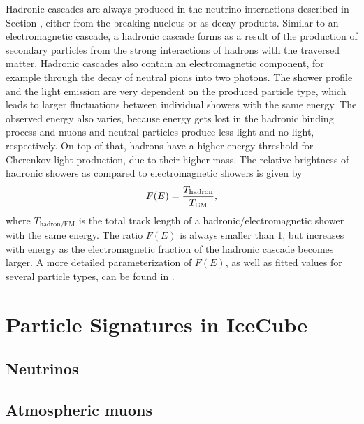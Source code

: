 Hadronic cascades are always produced in the neutrino interactions described in Section , either from the breaking nucleus or as decay products.
Similar to an electromagnetic cascade, a hadronic cascade forms as a result of the production of secondary particles from the strong interactions of hadrons with the traversed matter.
Hadronic cascades also contain an electromagnetic component, for example through the decay of neutral pions into two photons. 
The shower profile and the light emission are very dependent on the produced particle type, which leads to larger fluctuations between individual showers with the same energy.
The observed energy also varies, because energy gets lost in the hadronic binding process and muons and neutral particles produce less light and no light, respectively.
On top of that, hadrons have a higher energy threshold for Cherenkov light production, due to their higher mass.
The relative brightness of hadronic showers as compared to electromagnetic showers is given by 
\begin{equation}
    F(E) = \frac{T_\mathrm{hadron}}{T_\mathrm{EM}},%
    \labeq{relative_shower_brighness}
\end{equation}
where $T_\mathrm{hadron/EM}$ is the total track length of a hadronic/electromagnetic shower with the same energy.
The ratio $F(E)$ is always smaller than 1, but increases with energy as the electromagnetic fraction of the hadronic cascade becomes larger.
A more detailed parameterization of $F(E)$, as well as fitted values for several particle types, can be found in .


\section{Particle Signatures in IceCube}

\subsection{Neutrinos}

\subsection{Atmospheric muons}
